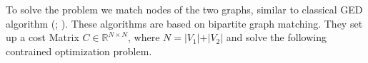 To solve the problem we match nodes of the two graphs, similar to classical GED algorithm (\citealp{hungarian2009}; \citealp{frankhauser2011}). These algorithms are based on bipartite graph matching. They set up a cost Matrix $C \in \mathbb{R}^{N \times N}$, where $N = \vert V_1 \vert + \vert V_2 \vert$ and solve the following contrained optimization problem.




